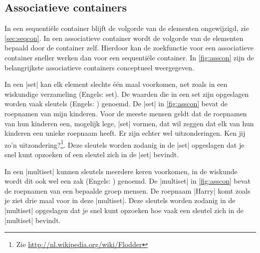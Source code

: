 \begin{cpplstShortInline}

\section{Associatieve containers}
\label{sec:asscon}
In een sequentiële container blijft de volgorde van de elementen ongewijzigd, zie \cref{sec:seqcon}.
In een associatieve container wordt de volgorde van de elementen bepaald door de container zelf.
Hierdoor kan de zoekfunctie voor een associatieve container sneller werken dan voor een sequentiële container.
In \cref{fig:asscon} zijn de belangrijkste associatieve containers conceptueel weergegeven.


In een |set| kan elk element slechts één maal voorkomen, net zoals in een wiskundige verzameling (Engels: set).
De waarden die in een set zijn opgeslagen worden vaak sleutels (Engels: ) genoemd.
De |set| in \cref{fig:asscon} bevat de roepnamen van mijn kinderen.
Voor de meeste mensen geldt dat de roepnamen van hun kinderen een, mogelijk lege, |set| vormen, dat wil zeggen dat elk van hun kinderen een unieke roepnaam heeft.
Er zijn echter wel uitzonderingen.
Ken jij zo'n uitzondering?\footnote{Zie \url{http://nl.wikipedia.org/wiki/Flodder}}.
Deze sleutels worden zodanig in de |set| opgeslagen dat je snel kunt opzoeken of een sleutel zich in de |set| bevindt.

In een |multiset| kunnen sleutels meerdere keren voorkomen, in de wiskunde wordt dit ook wel een zak (Engels: ) genoemd.
De |multiset| in \cref{fig:asscon} bevat de roepnamen van een bepaalde groep mensen.
De roepnaam |Harry| komt zoals je ziet drie maal voor in deze |multiset|.
Deze sleutels worden zodanig in de |multiset| opgeslagen dat je snel kunt opzoeken hoe vaak een sleutel zich in de |multiset| bevindt.


\end{cpplstShortInline}
